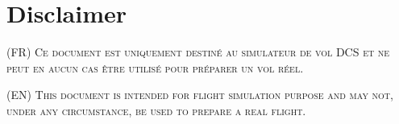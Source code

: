 \thispagestyle{default}




\section*{Disclaimer}

\vfill

{\Huge%

    \begin{doublespacing}%
        \textsc{(FR) Ce document est uniquement destiné au simulateur de vol DCS et ne peut en aucun cas être utilisé pour préparer un vol réel.}%
    \end{doublespacing}%
    
\vspace{4cm}

    \begin{doublespacing}%
        \textsc{(EN) This document is intended for flight simulation purpose and may not, under any circumstance, be used to prepare a real flight.}%
    \end{doublespacing}%

}

\vfill

